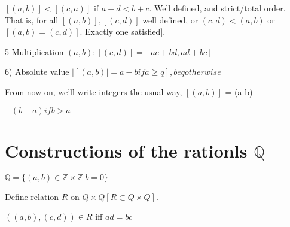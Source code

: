 \documentclass[twoside]{article}
\newcommand{\Z}{\mathbb{Z}}
\newcommand\Q{\mathbb{Q}}
\begin{document}
$    [(a,b)] < [(c,a)] \text{ if } a+ d < b+ c. 
$
    Well defined, and strict/total order. That is, for all $[(a,b)], [(c,d)]$ well defined, or $(c,d) < (a,b)$ or $[(a,b) = (c,d)]$. Exactly one satisfied]. 
    
    
    5 Multiplication $(a,b):[(c,d)] = [ac + bd, ad + bc]$

    6) Absolute value $\vert [(a,b) \vert = a - b if a \geq q], beq otherwise$

    From now on, we'll write integers the usual way, $[(a,b)]$ = (a-b) 

$    -(b-a) if b> a
$
    \section{Constructions of the rationls $\Q$}

    $\Q = \{(a,b) \in \Z \times \Z \vert b = 0\}$

    Define relation $R$ on $Q \times Q [R \subset Q \times Q]$.

    $((a,b),(c,d)) \in R$ iff $ad = bc$
\end{document}
